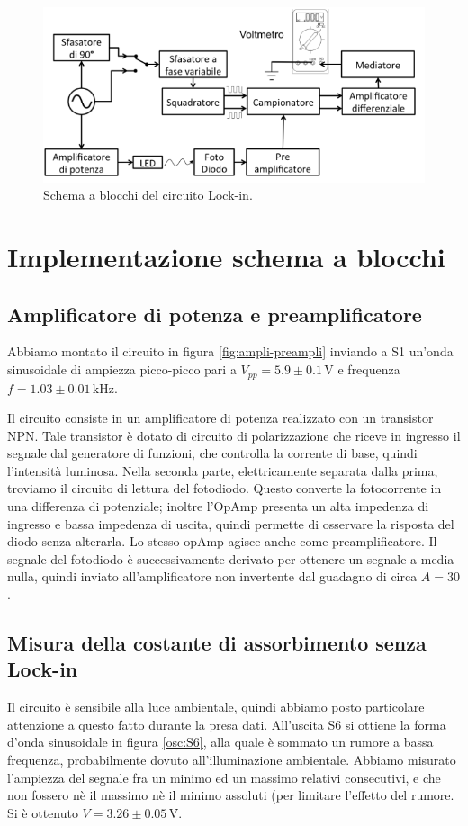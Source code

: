 \documentclass[10pt,a4paper]{article}
\begin{document}
\begin{figure}[!htb]
  \centering
  \includegraphics[scale=0.75]{schemablocchi.png}
\caption{Schema a blocchi del circuito Lock-in.\label{fig:schemablocchi}}
\end{figure}


\section{Implementazione schema a blocchi}

\subsection{Amplificatore di potenza e preamplificatore}
Abbiamo montato il circuito in figura \ref{fig:ampli-preampli} inviando a S1 un'onda sinusoidale di ampiezza picco-picco pari a $V_{pp}= 5.9\pm0.1 \,\mbox{V}$ e frequenza $f=1.03\pm0.01\,\mbox{kHz}$. 

Il circuito consiste in un amplificatore di potenza realizzato con un transistor NPN. Tale transistor è
dotato di circuito di polarizzazione che riceve in ingresso il segnale dal generatore di funzioni, che controlla la corrente di base, quindi l'intensità luminosa. Nella seconda parte, elettricamente separata dalla prima, troviamo il  circuito di lettura del fotodiodo. Questo converte la fotocorrente in una differenza di potenziale; inoltre  l'OpAmp presenta un alta impedenza di ingresso e bassa impedenza di uscita, quindi permette di osservare la risposta del diodo senza alterarla. Lo stesso opAmp agisce anche come preamplificatore. Il segnale del fotodiodo è successivamente derivato per ottenere un segnale a media nulla, quindi inviato all'amplificatore non invertente dal guadagno di circa $A = 30$.\\ 

\subsection{Misura della costante di assorbimento senza Lock-in}
Il circuito è sensibile alla luce ambientale, quindi abbiamo posto particolare attenzione a questo fatto durante la presa dati. %
All'uscita S6 si ottiene la forma d'onda sinusoidale in figura \ref{osc:S6}, alla quale è sommato un rumore a bassa frequenza, probabilmente dovuto all'illuminazione ambientale. Abbiamo misurato l'ampiezza del segnale fra un minimo ed un massimo relativi consecutivi, e che non fossero nè il massimo nè il minimo assoluti (per limitare l'effetto del rumore. Si è ottenuto $V=3.26\pm0.05\,\mbox{V}$.%
\end{document}
